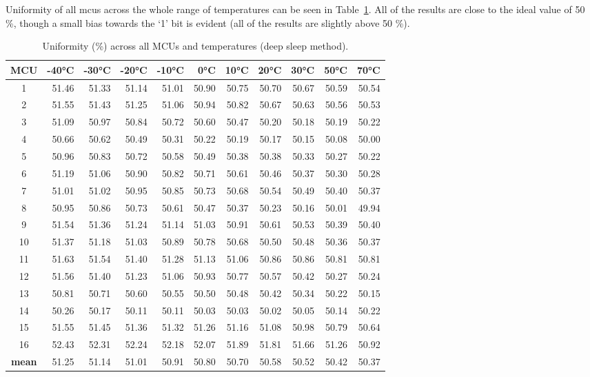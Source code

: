Uniformity of all \glspl{mcu} across the whole range of temperatures can be seen in Table~\ref{table:uniformity_deep_sleep}. All of the results are close to the ideal value of 50 \%, though a small bias towards the `1' bit is evident (all of the results are slightly above 50 \%).

\begin{table}[ht!]
    \centering
    \begin{tabular}{c||rrrrrrrrrr}
    \toprule
    \textbf{MCU} & \textbf{-40°C} & \textbf{-30°C} & \textbf{-20°C} & \textbf{-10°C} & \textbf{0°C} & \textbf{10°C} & \textbf{20°C} & \textbf{30°C} & \textbf{50°C} & \textbf{70°C} \\
    \midrule
    1    &  51.46 &  51.33 &  51.14 &  51.01 & 50.90 & 50.75 & 50.70 & 50.67 & 50.59 & 50.54 \\
    2    &  51.55 &  51.43 &  51.25 &  51.06 & 50.94 & 50.82 & 50.67 & 50.63 & 50.56 & 50.53 \\
    3    &  51.09 &  50.97 &  50.84 &  50.72 & 50.60 & 50.47 & 50.20 & 50.18 & 50.19 & 50.22 \\
    4    &  50.66 &  50.62 &  50.49 &  50.31 & 50.22 & 50.19 & 50.17 & 50.15 & 50.08 & 50.00 \\
    5    &  50.96 &  50.83 &  50.72 &  50.58 & 50.49 & 50.38 & 50.38 & 50.33 & 50.27 & 50.22 \\
    6    &  51.19 &  51.06 &  50.90 &  50.82 & 50.71 & 50.61 & 50.46 & 50.37 & 50.30 & 50.28 \\
    7    &  51.01 &  51.02 &  50.95 &  50.85 & 50.73 & 50.68 & 50.54 & 50.49 & 50.40 & 50.37 \\
    8    &  50.95 &  50.86 &  50.73 &  50.61 & 50.47 & 50.37 & 50.23 & 50.16 & 50.01 & 49.94 \\
    9    &  51.54 &  51.36 &  51.24 &  51.14 & 51.03 & 50.91 & 50.61 & 50.53 & 50.39 & 50.40 \\
    10   &  51.37 &  51.18 &  51.03 &  50.89 & 50.78 & 50.68 & 50.50 & 50.48 & 50.36 & 50.37 \\
    11   &  51.63 &  51.54 &  51.40 &  51.28 & 51.13 & 51.06 & 50.86 & 50.86 & 50.81 & 50.81 \\
    12   &  51.56 &  51.40 &  51.23 &  51.06 & 50.93 & 50.77 & 50.57 & 50.42 & 50.27 & 50.24 \\
    13   &  50.81 &  50.71 &  50.60 &  50.55 & 50.50 & 50.48 & 50.42 & 50.34 & 50.22 & 50.15 \\
    14   &  50.26 &  50.17 &  50.11 &  50.11 & 50.03 & 50.03 & 50.02 & 50.05 & 50.14 & 50.22 \\
    15   &  51.55 &  51.45 &  51.36 &  51.32 & 51.26 & 51.16 & 51.08 & 50.98 & 50.79 & 50.64 \\
    16   &  52.43 &  52.31 &  52.24 &  52.18 & 52.07 & 51.89 & 51.81 & 51.66 & 51.26 & 50.92 \\
    \textbf{mean} &  51.25 &  51.14 &  51.01 &  50.91 & 50.80 & 50.70 & 50.58 & 50.52 & 50.42 & 50.37 \\
    \bottomrule
    \end{tabular}
    \captionsetup{justification=centering,margin=0.5cm}
    \caption{Uniformity (\%) across all MCUs and temperatures (deep sleep method).}
    \label{table:uniformity_deep_sleep}
\end{table}


